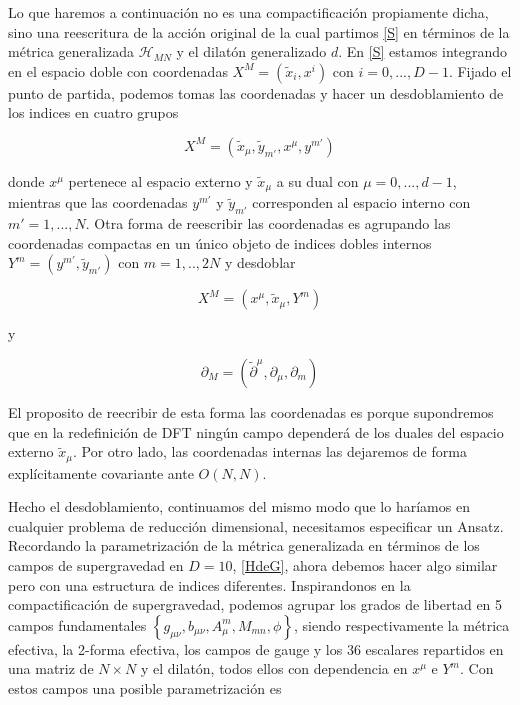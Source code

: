 \documentclass{article}
\numberwithin{equation}{section}
\begin{document}
Lo que haremos a continuación no es una compactificación propiamente dicha, sino una reescritura de la acción original de la cual partimos \ref{S} en términos de la métrica generalizada $ \mathcal{H}_{MN} $ y el dilatón generalizado $ d $. En \ref{S} estamos integrando en el espacio doble con coordenadas $ X^M=(\widetilde{x}_i, x^i) $  con $ i=0,...,D-1 $. Fijado el punto de partida, podemos tomas las coordenadas y hacer un desdoblamiento de los indices en cuatro grupos

\begin{equation}
X^M=(\widetilde{x}_{\mu}, \widetilde{y}_{m'}, x^{\mu}, y^{m'})
\end{equation}

donde $ x^{\mu} $ pertenece al espacio externo y $ \widetilde{x}_{\mu} $ a su dual con $ \mu=0,...,d-1 $, mientras que las coordenadas $ y^{m'} $ y $ \widetilde{y}_{m'} $ corresponden al espacio interno con $ m'=1,...,N $. Otra forma de reescribir las coordenadas es agrupando las coordenadas compactas en un único objeto de indices dobles internos $ Y^m=(y^{m'}, \widetilde{y}_{m'}) $ con $ m= 1,..,2N $ y desdoblar 

\begin{equation}
X^M=(x^{\mu}, \widetilde{x}_{\mu}, Y^m)
\end{equation}

y

\begin{equation}
\partial_M = (\widetilde{\partial}^{\mu}, \partial_{\mu}, \partial_m)
\end{equation}

El proposito de reecribir de esta forma las coordenadas es porque supondremos que en la redefinición de DFT ningún campo dependerá de los duales del espacio externo $ \widetilde{x}_{\mu} $. Por otro lado, las coordenadas internas las dejaremos de forma explícitamente covariante ante $ O(N,N) $.

Hecho el desdoblamiento, continuamos del mismo modo que lo haríamos en cualquier problema de reducción dimensional, necesitamos especificar un Ansatz. Recordando la parametrización de la métrica generalizada en términos de los campos de supergravedad en $ D=10 $, \ref{HdeG}, ahora debemos hacer algo similar pero con una estructura de indices diferentes. Inspirandonos en la compactificación de supergravedad, podemos agrupar los grados de libertad en 5 campos fundamentales $ \left\{ g_{\mu \nu}, b_{\mu \nu}, A_{\mu}^m, M_{m n}, \phi \right\} $, siendo respectivamente la métrica efectiva, la 2-forma efectiva, los campos de gauge y los 36 escalares repartidos en una matriz de $ N \times N $ y el dilatón, todos ellos con dependencia en $ x^{\mu} $ e $ Y^m $. Con estos campos una posible parametrización es
\end{document}
